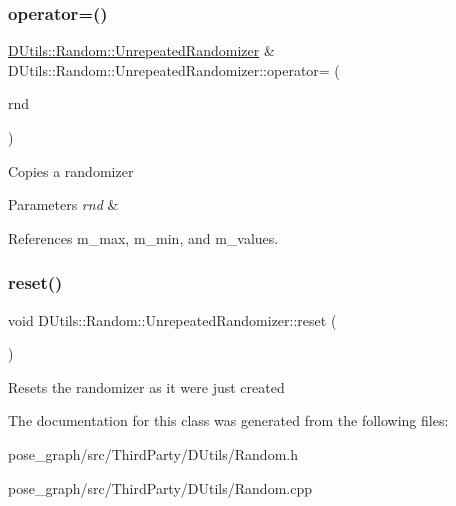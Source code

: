 \subsubsection{\texorpdfstring{operator=()}{operator=()}}
{\footnotesize\ttfamily \hyperlink{classDUtils_1_1Random_1_1UnrepeatedRandomizer}{D\+Utils\+::\+Random\+::\+Unrepeated\+Randomizer} \& D\+Utils\+::\+Random\+::\+Unrepeated\+Randomizer\+::operator= (\begin{DoxyParamCaption}\item[{const \hyperlink{classDUtils_1_1Random_1_1UnrepeatedRandomizer}{Unrepeated\+Randomizer} \&}]{rnd }\end{DoxyParamCaption})}

Copies a randomizer 
\begin{DoxyParams}{Parameters}
{\em rnd} & \\
\hline
\end{DoxyParams}


References m\+\_\+max, m\+\_\+min, and m\+\_\+values.

\mbox{\label{classDUtils_1_1Random_1_1UnrepeatedRandomizer_a315e00744de8bb3794d154797d02ec1f}} 
\subsubsection{\texorpdfstring{reset()}{reset()}}
{\footnotesize\ttfamily void D\+Utils\+::\+Random\+::\+Unrepeated\+Randomizer\+::reset (\begin{DoxyParamCaption}{ }\end{DoxyParamCaption})}

Resets the randomizer as it were just created 

The documentation for this class was generated from the following files\+:\begin{DoxyCompactItemize}
\item 
pose\+\_\+graph/src/\+Third\+Party/\+D\+Utils/Random.\+h\item 
pose\+\_\+graph/src/\+Third\+Party/\+D\+Utils/Random.\+cpp\end{DoxyCompactItemize}
